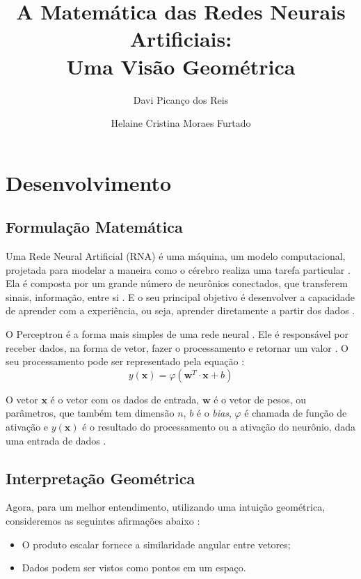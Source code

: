 \documentclass{ermacrs2025C}
\title{A Matemática das Redes Neurais Artificiais:\\Uma Visão Geométrica}
\author{Davi Picanço dos Reis}{Universidade Federal do Oeste do
Pará}{davipicancodosreis@gmail.com}
\author{Helaine Cristina Moraes Furtado}{Universidade Federal do
Oeste do Pará}{helaine.furtado@ufopa.edu.br}
\begin{document}
\maketitle

\section{Desenvolvimento}

\subsection{Formulação Matemática}

Uma Rede Neural Artificial (RNA) é uma máquina, um modelo
computacional, projetada para modelar a maneira como o cérebro
realiza uma tarefa particular \cite[p. 28]{haykin2001}. Ela é
composta por um grande número de neurônios conectados, que transferem
sinais, informação, entre si \cite[p. 3]{fausett1994}. E o seu
principal objetivo é desenvolver a capacidade de aprender com a
experiência, ou seja, aprender diretamente a partir dos dados
\cite[p. 28]{haykin2001}.

O Perceptron é a forma mais simples de uma rede neural \cite[p.
143]{haykin2001}. Ele é responsável por receber dados, na forma de
vetor, fazer o processamento e retornar um valor \cite[p.
3]{fausett1994}. O seu processamento pode ser representado pela
equação \cite[p. 37, adaptado]{haykin2001}:
\begin{equation}
  y(\mathbf x)=\varphi(\mathbf w^T\cdot \mathbf x+b)
\end{equation}

O vetor $\mathbf x$ é o vetor com os dados de entrada, $\mathbf w$ é
o vetor de pesos, ou parâmetros, que também tem dimensão $n$, $b$ é o
\textit{bias}, $\varphi$ é chamada de função de ativação e $y(\mathbf
x)$ é o resultado do processamento ou a ativação do neurônio, dada
uma entrada de dados \cite[p. 37-38]{haykin2001}.

\subsection{Interpretação Geométrica}

Agora, para um melhor entendimento, utilizando uma intuição
geométrica, consideremos as seguintes afirmações abaixo \cite[p.
51-52]{haykin2001}:
\begin{itemize}
  \item O produto escalar fornece a similaridade angular entre vetores;
  \item Dados podem ser vistos como pontos em um espaço.
\end{itemize}
\end{document}
